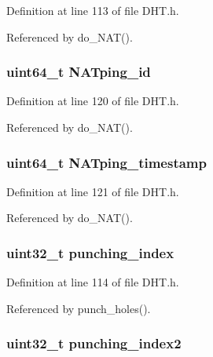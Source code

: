 Definition at line 113 of file D\+H\+T.\+h.



Referenced by do\+\_\+\+N\+A\+T().

\hypertarget{struct_n_a_t_addd9408d04ff8e05c569651b299f1b1b}{
\subsubsection[{N\+A\+Tping\+\_\+id}]{\setlength{\rightskip}{0pt plus 5cm}uint64\+\_\+t N\+A\+Tping\+\_\+id}}\label{struct_n_a_t_addd9408d04ff8e05c569651b299f1b1b}


Definition at line 120 of file D\+H\+T.\+h.



Referenced by do\+\_\+\+N\+A\+T().

\hypertarget{struct_n_a_t_a20937663f98914b69bb73f938deed531}{
\subsubsection[{N\+A\+Tping\+\_\+timestamp}]{\setlength{\rightskip}{0pt plus 5cm}uint64\+\_\+t N\+A\+Tping\+\_\+timestamp}}\label{struct_n_a_t_a20937663f98914b69bb73f938deed531}


Definition at line 121 of file D\+H\+T.\+h.



Referenced by do\+\_\+\+N\+A\+T().

\hypertarget{struct_n_a_t_aeb4b0f7724adb0857b15e0f34e95ecca}{
\subsubsection[{punching\+\_\+index}]{\setlength{\rightskip}{0pt plus 5cm}uint32\+\_\+t punching\+\_\+index}}\label{struct_n_a_t_aeb4b0f7724adb0857b15e0f34e95ecca}


Definition at line 114 of file D\+H\+T.\+h.



Referenced by punch\+\_\+holes().

\hypertarget{struct_n_a_t_a1d36817a78a0e261e7ca0982e17aa4ee}{
\subsubsection[{punching\+\_\+index2}]{\setlength{\rightskip}{0pt plus 5cm}uint32\+\_\+t punching\+\_\+index2}}\label{struct_n_a_t_a1d36817a78a0e261e7ca0982e17aa4ee}


